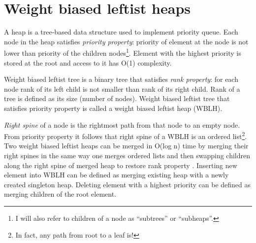 \section{Weight biased leftist heaps}

A heap is a tree-based data structure used to implement priority queue. Each node in the heap satisfies \textit{priority property}: priority of element at the node is not lower than priority of the children nodes\footnote{I will also refer to children of a node as ``subtrees'' or ``subheaps''.}. Element with the highest priority is stored at the root and access to it has O(1) complexity.

Weight biased leftist tree \cite{ChoSah96} is a binary tree that satisfies \textit{rank property}: for each node rank of its left child is not smaller than rank of its right child. Rank of a tree is defined as its size (number of nodes). Weight biased leftist tree that satisfies priority property is called a weight biased leftist heap (WBLH).

\textit{Right spine} of a node is the rightmost path from that node to an empty node. From priority property it follows that right spine of a WBLH is an ordered list\footnote{In fact, any path from root to a leaf is!}. Two weight biased leftist heaps can be merged in O(log n) time by merging their right spines in the same way one merges ordered lists and then swapping children along the right spine of merged heap to restore rank property \cite{Oka99}. Inserting new element into WBLH can be defined as merging existing heap with a newly created singleton heap. Deleting element with a highest priority can be defined as merging children of the root element.
